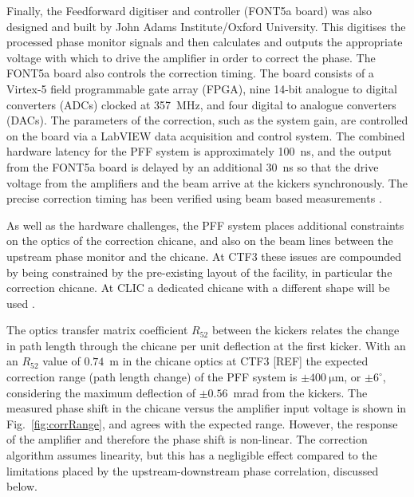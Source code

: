 \documentclass[%
 reprint,
superscriptaddress,
 amsmath,amssymb,
 prl,
]{revtex4-1}
\begin{document}
Finally, the Feedforward digitiser and controller (FONT5a board) 
\cite{RobertsThesis} was also 
designed and built by John Adams Institute/Oxford University. This digitises 
the processed phase monitor signals and then calculates and outputs the 
appropriate voltage with which to drive the amplifier in order to correct the 
phase. The FONT5a board also controls the correction 
timing. The board consists of a Virtex-5 field programmable gate array (FPGA), 
nine 14-bit analogue to digital converters (ADCs) clocked at 357~MHz, and four 
digital to analogue converters (DACs). The parameters of the correction, such 
as the system gain, are controlled on the board via a LabVIEW data 
acquisition and control system. The combined hardware latency for the PFF 
system is approximately 
100~ns, and the output from the FONT5a board is delayed by an additional 30~ns 
so that the drive voltage from the amplifiers and the beam arrive at the 
kickers synchronously. The precise correction timing has been verified using 
beam based measurements \cite{RobertsThesis}.%


As well as the hardware challenges, the PFF system places additional 
constraints on the optics of the correction 
chicane, and also on the beam lines between the upstream phase monitor and the 
chicane. At CTF3 these issues are compounded by being constrained by the 
pre-existing layout of the facility, in particular the correction chicane. At 
CLIC a dedicated chicane with a different shape will be used \cite{CLICCDR}.

The optics transfer matrix coefficient \(R_{52}\) between the kickers relates 
the change in path length through the chicane per unit 
deflection at the first kicker. 
With an an \(R_{52}\) value of \(0.74\)~m in the chicane optics at 
CTF3 [REF] the expected correction range (path length change) of the PFF system 
is \(\pm400~\mathrm{\mu m}\), or \(\pm6^\circ\), considering the maximum 
deflection of \(\pm0.56\)~mrad from the kickers.
The measured phase shift in the chicane versus the amplifier input voltage is 
shown in Fig.~\ref{fig:corrRange}, and agrees with the expected range. 
However, the response of the amplifier and therefore the phase shift is 
non-linear. The correction algorithm assumes linearity, but this has a 
negligible effect compared to the limitations placed by the
upstream-downstream phase correlation, discussed below.
\end{document}
